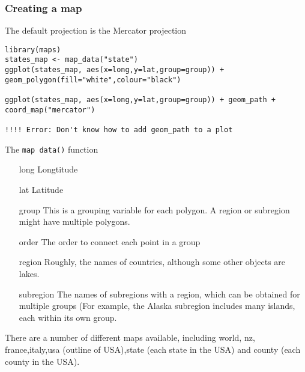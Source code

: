 \documentclass{beamer}
\begin{document}
\begin{frame}[fragile]
\frametitle{Creating a map}

The default projection is the Mercator projection

\begin{framed}
\begin{verbatim}
library(maps)
states_map <- map_data("state")
ggplot(states_map, aes(x=long,y=lat,group=group)) + geom_polygon(fill="white",colour="black")

ggplot(states_map, aes(x=long,y=lat,group=group)) + geom_path + coord_map("mercator")

!!!! Error: Don't know how to add geom_path to a plot
\end{verbatim}
\end{framed}
\end{frame}
\begin{frame}
The \texttt{map data()} function

\begin{itemize}
\item[long] Longtitude
\item[lat] Latitude
\item[group] This is a grouping variable for each polygon. A region or subregion might have multiple polygons.
\item[order] The order to connect each point in a group
\item[region] Roughly, the names of countries, although some other objects are lakes.
\item[subregion] The names of subregions with a region, which can be obtained for multiple groups
(For example, the Alaska subregion includes many islands, each within its own group.
\end{itemize}
There are a number of different maps available, including world, nz, france,italy,usa (outline of USA),state (each state in the USA) and county (each county in the USA).
\end{frame}
\end{document}
